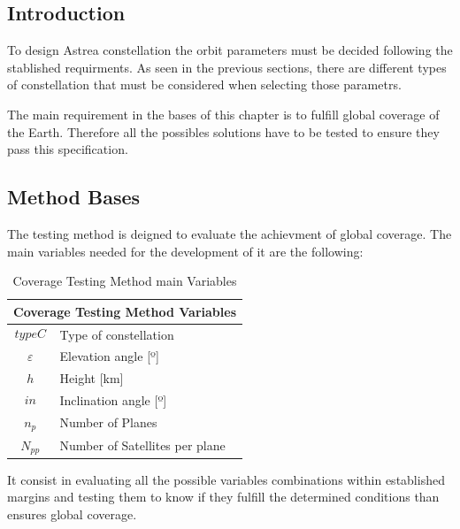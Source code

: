 \subsection{Introduction}

To design Astrea constellation the orbit parameters must be decided following the stablished requirments. As seen in the previous sections, there are different types of constellation that must be considered when selecting those parametrs. 

The main requirement in the bases of this chapter is to fulfill global coverage of the Earth. Therefore all the possibles solutions have to be tested to ensure they pass this specification.


\subsection{Method Bases}

The testing method is deigned to evaluate the achievment of global coverage. The main variables needed for the development of it are the following:

\begin{table}[H]
\centering
\begin{tabular}{|c|l|}
\hline
\multicolumn{2}{|c|}{Coverage Testing Method Variables}     \\ \hline
$$typeC$$          & Type of constellation        			 \\ \hline
$\varepsilon$      & Elevation angle {[}º{]}                  \\ \hline
$$h$$              & Height  {[}km{]}                          \\ \hline
$$in$$             & Inclination angle {[}º{]}                 \\ \hline
$n_{p}$            & Number of Planes                          \\ \hline
$N_{pp}$           & Number of Satellites per plane            \\ \hline
\end{tabular}
\caption{Coverage Testing Method main Variables}
\end{table}  

It consist in evaluating all the possible variables combinations within established margins and  testing them to know if they fulfill the determined conditions than ensures global coverage.

